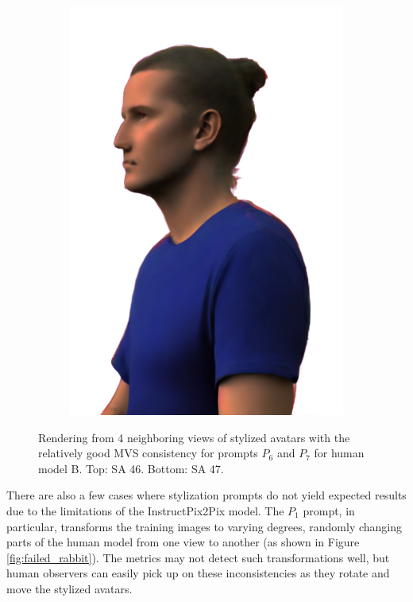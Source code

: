 \begin{figure}[ht]
\begin{subfigure}{0.2\linewidth}
		\includegraphics[width=\textwidth]{Figures/results/high/ephra_3d/26_render.png}
	\end{subfigure}
	\caption{Rendering from 4 neighboring views of stylized avatars with the relatively good MVS consistency for prompts $P_6$ and $P_7$ for human model B. Top: SA 46. Bottom: SA 47.}
	\label{fig:good_style}
\end{figure}

There are also a few cases where stylization prompts do not yield expected results due to the limitations of the InstructPix2Pix model. The $P_1$ prompt, in particular, transforms the training images to varying degrees, randomly changing parts of the human model from one view to another (as shown in Figure \ref{fig:failed_rabbit}). The metrics may not detect such transformations well, but human observers can easily pick up on these inconsistencies as they rotate and move the stylized avatars.

